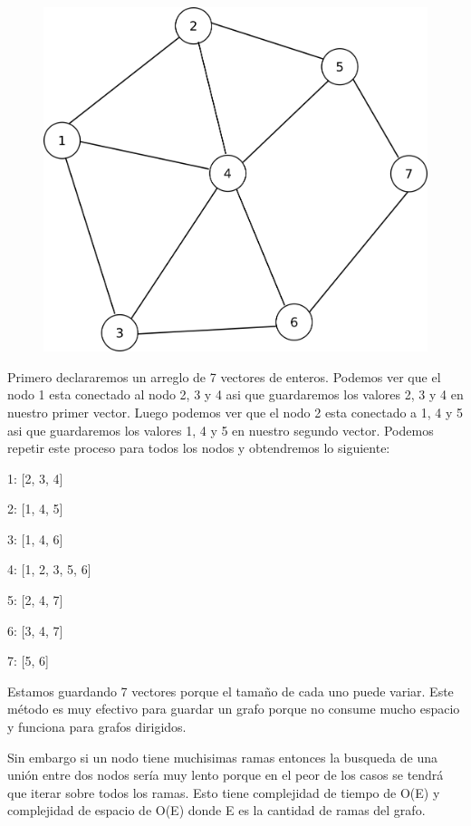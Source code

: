\documentclass{article}
\begin{document}
\begin{figure}[H]
    \centering
    \includegraphics[width=0.32\paperwidth]{lista}
\end{figure}

Primero declararemos un arreglo de 7 vectores de enteros. Podemos ver que el nodo 1 esta conectado al nodo 2, 3 y 4 asi que guardaremos los valores 2, 3 y 4 en nuestro primer vector. Luego podemos ver que el nodo 2 esta conectado a 1, 4 y 5 asi que guardaremos los valores 1, 4 y 5 en nuestro segundo vector. Podemos repetir este proceso para todos los nodos y obtendremos lo siguiente:

1: [2, 3, 4]

2: [1, 4, 5]

3: [1, 4, 6]

4: [1, 2, 3, 5, 6]

5: [2, 4, 7]

6: [3, 4, 7]

7: [5, 6]

Estamos guardando 7 vectores porque el tamaño de cada uno puede variar. Este método es muy efectivo para guardar un grafo porque no consume mucho espacio y funciona para grafos dirigidos.

Sin embargo si un nodo tiene muchisimas ramas entonces la busqueda de una unión entre dos nodos sería muy lento porque en el peor de los casos se tendrá que iterar sobre todos los ramas. Esto tiene complejidad de tiempo de O(E) y complejidad de espacio de O(E) donde E es la cantidad de ramas del grafo.
\end{document}
